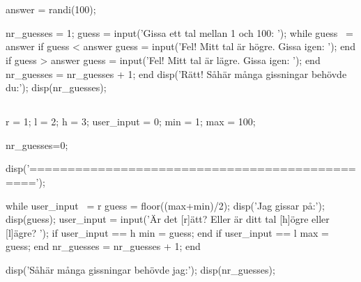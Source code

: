 \section*{}
\subsection*{}
\vspace{3pt}
\begin{matlab}
answer = randi(100); %

nr_guesses = 1;
guess = input('Gissa ett tal mellan 1 och 100: ');
while guess ~= answer
    if guess < answer
        guess = input('Fel! Mitt tal är högre. Gissa igen: ');
    end
    if guess > answer
        guess = input('Fel! Mitt tal är lägre. Gissa igen: ');
    end
    nr_guesses = nr_guesses + 1;
end
disp('Rätt! Såhär många gissningar behövde du:');
disp(nr_guesses);
\end{matlab}

\subsection*{}
\vspace{3pt}
\begin{matlab}
r = 1; %
l = 2; %
h = 3; %
user_input = 0; %
min = 1;
max = 100;

nr_guesses=0;

disp('===============================================');

while user_input ~= r
    guess = floor((max+min)/2);
    disp('Jag gissar på:');
    disp(guess);
    user_input = input('Är det [r]ätt? Eller är ditt tal [h]ögre eller [l]ägre? ');
    if user_input == h
        min = guess;
    end
    if user_input == l
        max = guess;
    end
	nr_guesses = nr_guesses + 1;
end

disp('Såhär många gissningar behövde jag:');
disp(nr_guesses);
\end{matlab}


\section*{}

